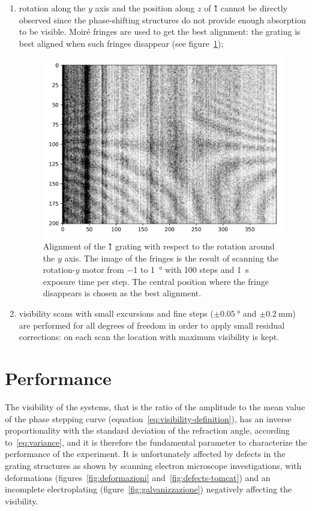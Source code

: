\begin{enumerate}
        axis is not critical, and a change in visibility of less than
        \SI{1}{\percent} is observed by displacing it by as much as
        \SI{5}{\milli\metre};
    \item rotation along the $y$ axis and the position along $z$
        of \G{1} cannot be directly observed since the phase-shifting
        structures do not provide enough absorption to be visible.
        Moir\'e fringes are used to get the best alignment: the grating is
        best aligned when such fringes disappear (see
        figure~\ref{fig:alignment-g1roty});
        \begin{figure}[htb]
            \centering
            \includegraphics[width=.5\textwidth]{gfx/mythen-edge-on/g1roty.png}
            \caption[Alignment of the \G1 grating around the $y$ axis.]{Alignment of the \G1 grating with respect to the rotation
            around the $y$ axis. The image of the fringes is the result of
            scanning the rotation-$y$ motor from \num{-1} to
            \SI{+1}{\degree} with \num{100} steps and \SI{1}{\second}
            exposure time per step. The central position where the fringe
            disappears is chosen as the best alignment.}
            \label{fig:alignment-g1roty}
        \end{figure}
    \item visibility scans with small excursions and fine steps
        ($\pm\SI{0.05}{\degree}$ and $\pm\SI{0.2}{\milli\meter}$) are
        performed for all degrees of freedom in order to apply small
        residual corrections: on each scan the location with maximum
        visibility is kept.
\end{enumerate}

\section{Performance}
The visibility of the systems, that is the ratio of the amplitude to the
mean value of the phase stepping curve
(equation~\ref{eq:visibility-definition}), has an inverse proportionality
with the standard deviation of the refraction angle, according
to~\eqref{eq:variance}, and it is therefore the fundamental parameter to
characterize the performance of the experiment. It is unfortunately affected
by defects in the grating structures as shown by scanning electron
microscope investigations, with deformations (figures~\ref{fig:deformazioni}
and~\ref{fig:defects-tomcat})
and an incomplete electroplating (figure~\ref{fig:galvanizzazione})
negatively affecting the visibility.

